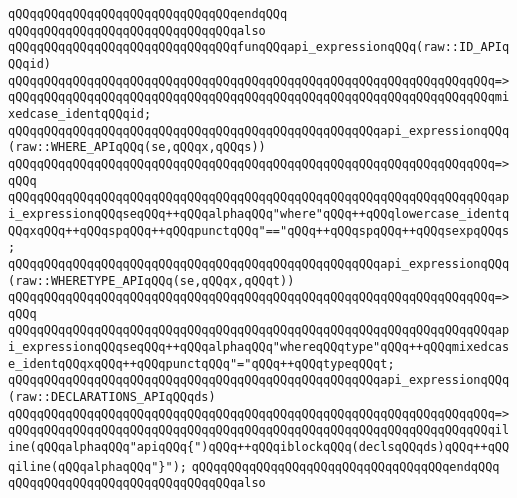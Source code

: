 \verb|qQQqqQQqqQQqqQQqqQQqqQQqqQQqqQQqendqQQq|\newline
\newline
\verb|qQQqqQQqqQQqqQQqqQQqqQQqqQQqqQQqalso|\newline
\verb|qQQqqQQqqQQqqQQqqQQqqQQqqQQqqQQqfunqQQqapi_expressionqQQq(raw::ID_APIqQQqid)|\newline
\verb|qQQqqQQqqQQqqQQqqQQqqQQqqQQqqQQqqQQqqQQqqQQqqQQqqQQqqQQqqQQqqQQqqQQq=>|\newline
\verb|qQQqqQQqqQQqqQQqqQQqqQQqqQQqqQQqqQQqqQQqqQQqqQQqqQQqqQQqqQQqqQQqqQQqmixedcase_identqQQqid;|\newline
\newline
\verb|qQQqqQQqqQQqqQQqqQQqqQQqqQQqqQQqqQQqqQQqqQQqqQQqqQQqapi_expressionqQQq(raw::WHERE_APIqQQq(se,qQQqx,qQQqs))|\newline
\verb|qQQqqQQqqQQqqQQqqQQqqQQqqQQqqQQqqQQqqQQqqQQqqQQqqQQqqQQqqQQqqQQqqQQq=>qQQq|\newline
\verb|qQQqqQQqqQQqqQQqqQQqqQQqqQQqqQQqqQQqqQQqqQQqqQQqqQQqqQQqqQQqqQQqqQQqapi_expressionqQQqseqQQq++qQQqalphaqQQq"where"qQQq++qQQqlowercase_identqQQqxqQQq++qQQqspqQQq++qQQqpunctqQQq"=="qQQq++qQQqspqQQq++qQQqsexpqQQqs;|\newline
\newline
\verb|qQQqqQQqqQQqqQQqqQQqqQQqqQQqqQQqqQQqqQQqqQQqqQQqqQQqapi_expressionqQQq(raw::WHERETYPE_APIqQQq(se,qQQqx,qQQqt))|\newline
\verb|qQQqqQQqqQQqqQQqqQQqqQQqqQQqqQQqqQQqqQQqqQQqqQQqqQQqqQQqqQQqqQQqqQQq=>qQQq|\newline
\verb|qQQqqQQqqQQqqQQqqQQqqQQqqQQqqQQqqQQqqQQqqQQqqQQqqQQqqQQqqQQqqQQqqQQqapi_expressionqQQqseqQQq++qQQqalphaqQQq"whereqQQqtype"qQQq++qQQqmixedcase_identqQQqxqQQq++qQQqpunctqQQq"="qQQq++qQQqtypeqQQqt;|\newline
\newline
\verb|qQQqqQQqqQQqqQQqqQQqqQQqqQQqqQQqqQQqqQQqqQQqqQQqqQQqapi_expressionqQQq(raw::DECLARATIONS_APIqQQqds)|\newline
\verb|qQQqqQQqqQQqqQQqqQQqqQQqqQQqqQQqqQQqqQQqqQQqqQQqqQQqqQQqqQQqqQQqqQQq=>|\newline
\verb|qQQqqQQqqQQqqQQqqQQqqQQqqQQqqQQqqQQqqQQqqQQqqQQqqQQqqQQqqQQqqQQqqQQqiline(qQQqalphaqQQq"apiqQQq{")qQQq++qQQqiblockqQQq(declsqQQqds)qQQq++qQQqiline(qQQqalphaqQQq"}");|\newline
\verb|qQQqqQQqqQQqqQQqqQQqqQQqqQQqqQQqqQQqendqQQq|\newline
\newline
\verb|qQQqqQQqqQQqqQQqqQQqqQQqqQQqqQQqalso|\newline

